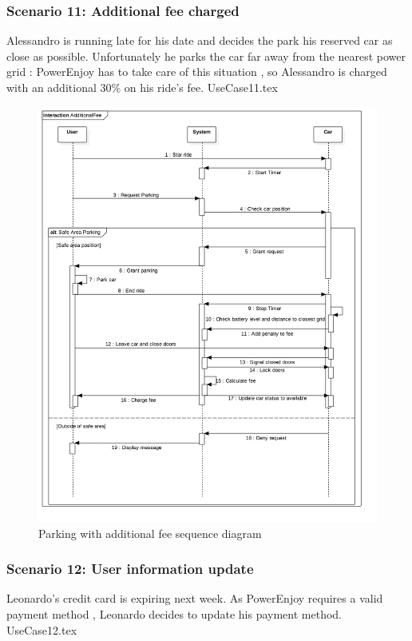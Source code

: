 \documentclass[12pt]{article}
\begin{document}
		\subsubsection{Scenario 11: Additional fee charged}
		Alessandro is running late for his date and decides the park his reserved car as close as 
		possible. Unfortunately he parks the car far away from the nearest power grid : PowerEnjoy 
		has to take care of this situation , so Alessandro is charged with an additional 30\% on his
		ride's fee.
		\FloatBarrier
		{UseCase11.tex}
		\newpage
		\begin{figure}[htbp]
		\caption{Parking with additional fee sequence diagram}
		\includegraphics[scale=0.49]{Images/SequenceDiagram/AdditionalFee.png}
 	 	\end{figure}
 	 	\clearpage
 	 	
		\subsubsection{Scenario 12: User information update}
		Leonardo's credit card is expiring next week. As PowerEnjoy requires a valid payment method ,
		Leonardo decides to update his payment method.
		\FloatBarrier
		{UseCase12.tex}
		\newpage
		
\end{document}
